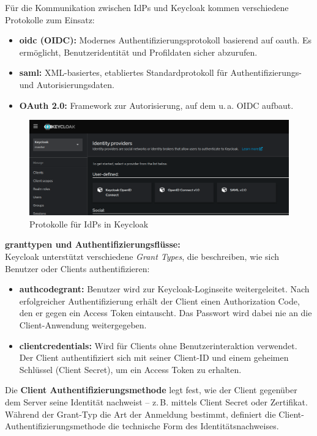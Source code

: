 \documentclass[a4paper,12pt]{article}
\begin{document}
	Für die Kommunikation zwischen IdPs und Keycloak kommen verschiedene Protokolle zum Einsatz:
	\begin{itemize}
		\item \textbf{\gls{oidc} (OIDC):} Modernes Authentifizierungsprotokoll basierend auf \gls{oauth}. Es ermöglicht, Benutzeridentität und Profildaten sicher abzurufen.
		\item \textbf{\gls{saml}:} XML-basiertes, etabliertes Standardprotokoll für Authentifizierungs- und Autorisierungsdaten.
		\item \textbf{OAuth 2.0:} Framework zur Autorisierung, auf dem u.\,a. OIDC aufbaut.
	\end{itemize}
	
	\begin{figure}[H]
		\centering
		\includegraphics[width=0.9\linewidth]{screenshot007}
		\caption{Protokolle für IdPs in Keycloak}
		\label{fig:screenshot007}
	\end{figure}
	
	\vspace{0.5em}
	\textbf{\gls{granttype}n und Authentifizierungsflüsse:}\\
	Keycloak unterstützt verschiedene \textit{Grant Types}, die beschreiben, wie sich Benutzer oder Clients authentifizieren:
	
	\begin{itemize}
		\item \textbf{\gls{authcodegrant}:} Benutzer wird zur Keycloak-Loginseite weitergeleitet. Nach erfolgreicher Authentifizierung erhält der Client einen Authorization Code, den er gegen ein Access Token eintauscht. Das Passwort wird dabei nie an die Client-Anwendung weitergegeben.
		\item \textbf{\gls{clientcredentials}:} Wird für Clients ohne Benutzerinteraktion verwendet. Der Client authentifiziert sich mit seiner Client-ID und einem geheimen Schlüssel (Client Secret), um ein Access Token zu erhalten.
	\end{itemize}
	
	Die \textbf{Client Authentifizierungsmethode} legt fest, wie der Client gegenüber dem Server seine Identität nachweist – z.\,B. mittels Client Secret oder Zertifikat. Während der Grant-Typ die Art der Anmeldung bestimmt, definiert die Client-Authentifizierungsmethode die technische Form des Identitätsnachweises.
	
\end{document}
